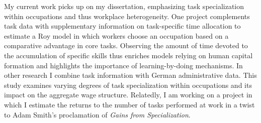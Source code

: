 \documentclass[a4paper,11pt]{article}
\begin{document}

My current work picks up on my dissertation, emphasizing task specialization within occupations and thus workplace heterogeneity. One project complements task data with supplementary information on task-specific time allocation to estimate a Roy model in which workers choose an occupation based on a comparative advantage in core tasks. Observing the amount of time devoted to the accumulation of specific skills thus enriches models relying on human capital formation and highlights the importance of learning-by-doing mechanisms. In other research I combine task information with German administrative data. This study examines varying degrees of task specialization within occupations and its impact on the aggregate wage structure. Relatedly, I am working on a project in which I estimate the returns to the number of tasks performed at work in a twist to Adam Smith's proclamation of \textit{Gains from Specialization}. 

\end{document}
